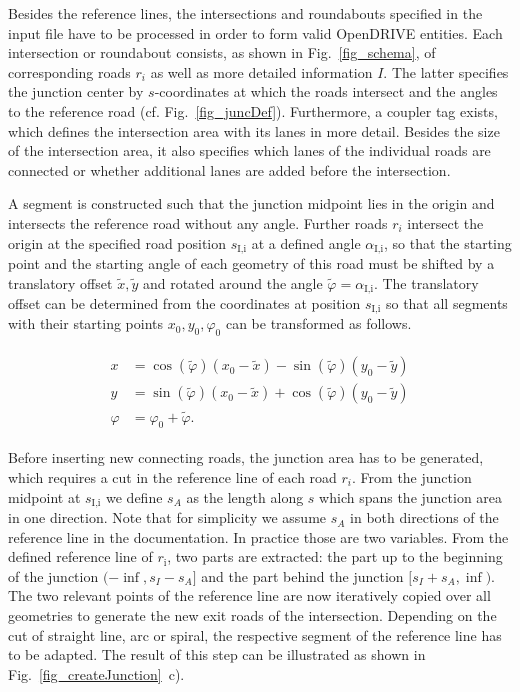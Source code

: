 \documentclass[a4paper, 10pt, conference]{ieeeconf}      %
\begin{document}
    Besides the reference lines, the intersections and roundabouts specified in the input file have to be processed in order to form valid OpenDRIVE entities. Each intersection or roundabout consists, as shown in Fig.~\ref{fig_schema}, of corresponding roads \(r_i\) as well as more detailed information \(I\). The latter specifies the junction center by $s$-coordinates at which the roads intersect and the angles to the reference road (cf. Fig.~\ref{fig_juncDef}). Furthermore, a coupler tag exists, which defines the intersection area with its lanes in more detail. Besides the size of the intersection area, it also specifies which lanes of the individual roads are connected or whether additional lanes are added before the intersection.

    A segment is constructed such that the junction midpoint lies in the origin and intersects the reference road without any angle. Further roads \(r_i\) intersect the origin at the specified road position \(s_\text{I,i}\) at a defined angle \(\alpha_\text{I,i}\), so that the starting point and the starting angle of each geometry of this road must be shifted by a translatory offset \(\tilde{x}, \tilde{y}\) and rotated around the angle \(\tilde{\varphi} = \alpha_\text{I,i}\). The translatory offset can be determined from the coordinates at position \(s_\text{I,i}\) so that all segments with their starting points \(x_0,y_0,\varphi_0\) can be transformed as follows.

    \begin{align} \label{eq_transform}
        \begin{split}
            x &= \cos(\tilde{\varphi}) \left(x_0-\tilde{x}\right) - \sin(\tilde{\varphi}) \left(y_0-\tilde{y}\right) \\
            y &= \sin(\tilde{\varphi}) \left(x_0-\tilde{x}\right) + \cos(\tilde{\varphi}) \left(y_0-\tilde{y}\right) \\
            \varphi &= \varphi_0 + \tilde{\varphi} \text{.} 
        \end{split}
    \end{align}

    Before inserting new connecting roads, the junction area has to be generated, which requires a cut in the reference line of each road $r_i$. From the junction midpoint at \(s_\text{I,i}\) we define \(s_A\) as the length along $s$ which spans the junction area in one direction. Note that for simplicity we assume \(s_A\) in both directions of the reference line in the documentation. In practice those are two variables. From the defined reference line of $r_\text{i}$, two parts are extracted: the part up to the beginning of the junction \((-\inf,s_I - s_A]\) and the part behind the junction \([s_I + s_A, \inf)\). The two relevant points of the reference line are now iteratively copied over all geometries to generate the new exit roads of the intersection. Depending on the cut of straight line, arc or spiral, the respective segment of the reference line has to be adapted. The result of this step can be illustrated as shown in Fig.~\ref{fig_createJunction}~c).
    
\end{document}
